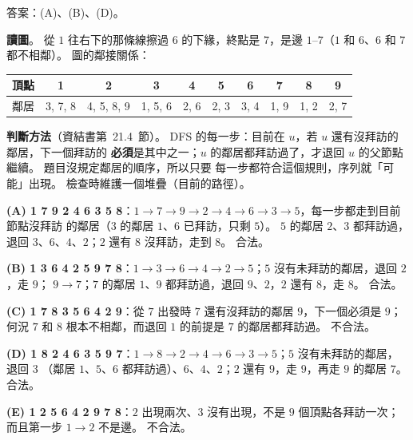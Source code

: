 \begin{pastsoln}
答案：(A)、(B)、(D)。

\textbf{讀圖}。 從 $1$ 往右下的那條線擦過 $6$ 的下緣，終點是 $7$，是邊 $1$--$7$（$1$ 和 $6$、$6$ 和 $7$
都不相鄰）。 圖的鄰接關係：
\begin{center}
\begin{tabular}{c*{9}{c}}
\toprule
頂點 & 1 & 2 & 3 & 4 & 5 & 6 & 7 & 8 & 9 \\
\midrule
鄰居 & 3, 7, 8 & 4, 5, 8, 9 & 1, 5, 6 & 2, 6 & 2, 3 & 3, 4 & 1, 9 & 1, 2 & 2, 7 \\
\bottomrule
\end{tabular}
\end{center}

\textbf{判斷方法}（資結書第~21.4~節）。 DFS 的每一步：目前在 $u$，若 $u$ 還有沒拜訪的鄰居，下一個拜訪的
\textbf{必須}是其中之一；$u$ 的鄰居都拜訪過了，才退回 $u$ 的父節點繼續。 題目沒規定鄰居的順序，所以只要
每一步都符合這個規則，序列就「可能」出現。 檢查時維護一個堆疊（目前的路徑）。

\textbf{(A) 1 7 9 2 4 6 3 5 8}：$1 \to 7 \to 9 \to 2 \to 4 \to 6 \to 3 \to 5$，每一步都走到目前節點沒拜訪
的鄰居（$3$ 的鄰居 $1$、$6$ 已拜訪，只剩 $5$）。 $5$ 的鄰居 $2$、$3$ 都拜訪過，退回 $3$、$6$、$4$、$2$；$2$
還有 $8$ 沒拜訪，走到 $8$。 合法。

\textbf{(B) 1 3 6 4 2 5 9 7 8}：$1 \to 3 \to 6 \to 4 \to 2 \to 5$；$5$ 沒有未拜訪的鄰居，退回 $2$，走 $9$；
$9 \to 7$；$7$ 的鄰居 $1$、$9$ 都拜訪過，退回 $9$、$2$，$2$ 還有 $8$，走 $8$。 合法。

\textbf{(C) 1 7 8 3 5 6 4 2 9}：從 $7$ 出發時 $7$ 還有沒拜訪的鄰居 $9$，下一個必須是 $9$；何況 $7$ 和 $8$
根本不相鄰，而退回 $1$ 的前提是 $7$ 的鄰居都拜訪過。 不合法。

\textbf{(D) 1 8 2 4 6 3 5 9 7}：$1 \to 8 \to 2 \to 4 \to 6 \to 3 \to 5$；$5$ 沒有未拜訪的鄰居，退回 $3$
（鄰居 $1$、$5$、$6$ 都拜訪過）、$6$、$4$、$2$；$2$ 還有 $9$，走 $9$，再走 $9$ 的鄰居 $7$。 合法。

\textbf{(E) 1 2 5 6 4 2 9 7 8}：$2$ 出現兩次、$3$ 沒有出現，不是 $9$ 個頂點各拜訪一次；而且第一步
$1 \to 2$ 不是邊。 不合法。
\end{pastsoln}

